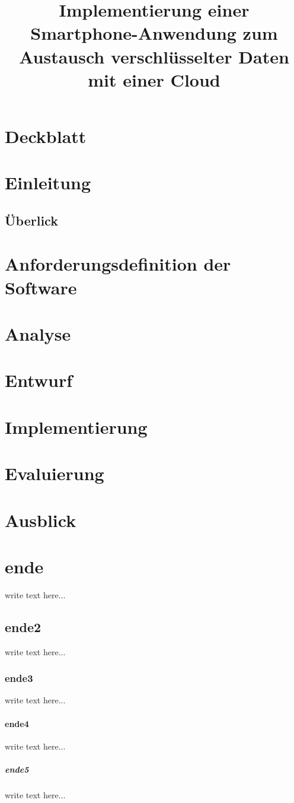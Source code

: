 \documentclass[11pt, a4paper]{scrreprt}
\title{Implementierung einer Smartphone-Anwendung zum Austausch verschlüsselter Daten mit einer Cloud}
\begin{document}
\titlepage
\maketitle
\tableofcontents

\part{Deckblatt}

\part{Einleitung}
\chapter{Überlick}

\part{Anforderungsdefinition der Software}

\part{Analyse}

\part{Entwurf}

\part{Implementierung}

\part{Evaluierung}

\part{Ausblick}

\part{ende}
write text here...
\chapter{ende2}
write text here...
\section{ende3}
write text here...
\subsection{ende4}
write text here...
\subsubsection{ende5}
write text here...
\end{document}
